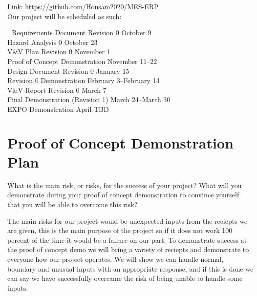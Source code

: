 \documentclass{article}
\begin{document}
Link: https://github.com/Housam2020/MES-ERP \\

Our project will be scheduled as such: \\

\begin{tabbing}
  \hspace{8cm} \= \hspace{3cm} \= \kill
  Requirements Document Revision 0 \> October 9 \\
  Hazard Analysis 0 \> October 23 \\
  V\&V Plan Revision 0 \> November 1 \\
  Proof of Concept Demonstration \> November 11--22 \\
  Design Document Revision 0 \> January 15 \\
  Revision 0 Demonstration \> February 3--February 14 \\
  V\&V Report Revision 0 \> March 7 \\
  Final Demonstration (Revision 1) \> March 24--March 30 \\
  EXPO Demonstration \> April TBD \\
\end{tabbing}


\section{Proof of Concept Demonstration Plan}

What is the main risk, or risks, for the success of your project?  What will you
demonstrate during your proof of concept demonstration to convince yourself that
you will be able to overcome this risk?

\vspace{0.5cm}

The main risks for our project would be unexpected inputs from the reciepts we are 
given, this is the main purpose of the project so if it does not work 100 percent of the 
time it would be a failure on our part. To demonstrate success at the proof of concept
demo we will bring a variety of reciepts and demonstrate to everyone how our project operates.
We will show we can handle normal, boundary and unusual inputs with an appropriate response, and if 
this is done we can say we have successfully overcame the risk of being unable to handle some inputs. 
\end{document}
